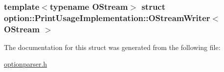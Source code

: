 \subsubsection*{template$<$typename \-O\-Stream$>$ struct option\-::\-Print\-Usage\-Implementation\-::\-O\-Stream\-Writer$<$ O\-Stream $>$}



\-The documentation for this struct was generated from the following file\-:\begin{DoxyCompactItemize}
\item 
\hyperlink{optionparser_8h}{optionparser.\-h}\end{DoxyCompactItemize}
